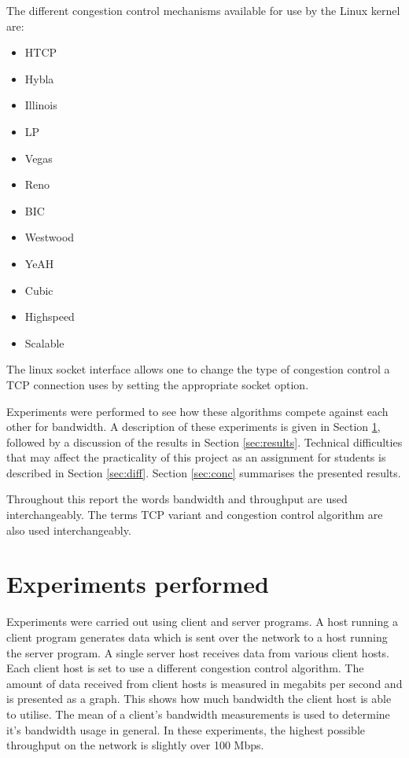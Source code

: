 \documentclass[11pt,a4paper,twocolumn]{article}
\begin{document}
The different congestion control mechanisms available for use by the Linux kernel are:
\begin{itemize}
\item HTCP
\item Hybla
\item Illinois
\item LP
\item Vegas
\item Reno
\item BIC
\item Westwood
\item YeAH
\item Cubic
\item Highspeed
\item Scalable
\end{itemize}
The linux socket interface allows one to change the type of congestion control a TCP connection uses by setting
the appropriate socket option.

Experiments were
performed to see how these algorithms compete against each other for bandwidth. A description
of these experiments is given in Section \ref{sec:exp}, followed by a discussion of the results in Section \ref{sec:results}.
Technical difficulties that may affect the practicality of this project as an assignment for students is described
in Section \ref{sec:diff}. Section \ref{sec:conc} summarises the presented results.

Throughout this report the words bandwidth and throughput are used interchangeably. The terms TCP variant and
congestion control algorithm are also used interchangeably.

\section{Experiments performed}
\label{sec:exp}
Experiments were carried out using client and server programs. A host running a client program generates data which is sent over the
network to a host running the server program. A single server host receives data from various client hosts. Each client host is set to use a different congestion control algorithm.
The amount of data received from client hosts is measured in megabits per second and is presented as a graph. This shows how much bandwidth the client host is able to utilise.
The mean of a client's bandwidth measurements is used to determine it's bandwidth usage in general. In these experiments, the highest possible throughput on the
network is slightly over 100 Mbps.
\end{document}
